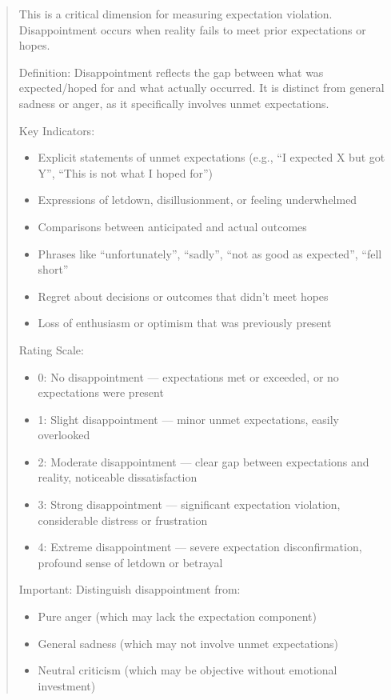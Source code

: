 \documentclass[
    type = master, %
    degree = professional,        %
    decl-page,  %
    twoside,                %
    fontset = fandol %
  ]{njuthesis}
\begin{document}
\begin{quote}
This is a critical dimension for measuring expectation violation.
Disappointment occurs when reality fails to meet prior expectations or hopes.

Definition: Disappointment reflects the gap between what was expected/hoped for
and what actually occurred. It is distinct from general sadness or anger,
as it specifically involves unmet expectations.

Key Indicators:
\begin{itemize}
  \item Explicit statements of unmet expectations
        (e.g., ``I expected X but got Y'', ``This is not what I hoped for'')
  \item Expressions of letdown, disillusionment, or feeling underwhelmed
  \item Comparisons between anticipated and actual outcomes
  \item Phrases like ``unfortunately'', ``sadly'', ``not as good as expected'', ``fell short''
  \item Regret about decisions or outcomes that didn't meet hopes
  \item Loss of enthusiasm or optimism that was previously present
\end{itemize}

Rating Scale:
\begin{itemize}
  \item 0: No disappointment --- expectations met or exceeded, or no expectations were present
  \item 1: Slight disappointment --- minor unmet expectations, easily overlooked
  \item 2: Moderate disappointment --- clear gap between expectations and reality, noticeable dissatisfaction
  \item 3: Strong disappointment --- significant expectation violation, considerable distress or frustration
  \item 4: Extreme disappointment --- severe expectation disconfirmation, profound sense of letdown or betrayal
\end{itemize}

Important: Distinguish disappointment from:
\begin{itemize}
  \item Pure anger (which may lack the expectation component)
  \item General sadness (which may not involve unmet expectations)
  \item Neutral criticism (which may be objective without emotional investment)
\end{itemize}


\end{quote}
\end{document}
